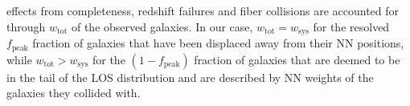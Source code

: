                                                                                                                                                                                                                                                                         effects from completeness, redshift failures and fiber collisions are accounted for through $w_\mathrm{tot}$ of the observed galaxies. In our case, $w_\mathrm{tot}=w_\mathrm{sys}$ for the resolved $f_\mathrm{peak}$ fraction of galaxies that have been displaced away from their NN positions, while $w_\mathrm{tot}>w_\mathrm{sys}$ for the $(1-f_\mathrm{peak})$ fraction of galaxies that are deemed to be in the tail of the LOS distribution and are described by NN weights of the galaxies they collided with. 



